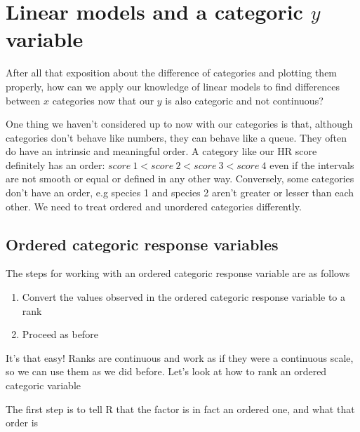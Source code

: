 \documentclass[
]{book}
\providecommand{\tightlist}{%
  \setlength{\itemsep}{0pt}\setlength{\parskip}{0pt}}
\begin{document}
\hypertarget{linear-models-and-a-categoric-y-variable}{%
\section{\texorpdfstring{Linear models and a categoric \(y\) variable}{Linear models and a categoric y variable}}\label{linear-models-and-a-categoric-y-variable}}

After all that exposition about the difference of categories and plotting them properly, how can we apply our knowledge of linear models to find differences between \(x\) categories now that our \(y\) is also categoric and not continuous?

One thing we haven't considered up to now with our categories is that, although categories don't behave like numbers, they can behave like a queue. They often do have an intrinsic and meaningful order. A category like our HR score definitely has an order: \(score\ 1 < score\ 2 < score\ 3 < score\ 4\) even if the intervals are not smooth or equal or defined in any other way. Conversely, some categories don't have an order, e.g species 1 and species 2 aren't greater or lesser than each other. We need to treat ordered and unordered categories differently.

\hypertarget{ordered-categoric-response-variables}{%
\subsection{Ordered categoric response variables}\label{ordered-categoric-response-variables}}

The steps for working with an ordered categoric response variable are as follows

\begin{enumerate}
\def\labelenumi{\arabic{enumi}.}
\tightlist
\item
  Convert the values observed in the ordered categoric response variable to a rank
\item
  Proceed as before
\end{enumerate}

It's that easy! Ranks are continuous and work as if they were a continuous scale, so we can use them as we did before. Let's look at how to rank an ordered categoric variable

The first step is to tell R that the factor is in fact an ordered one, and what that order is
\end{document}
